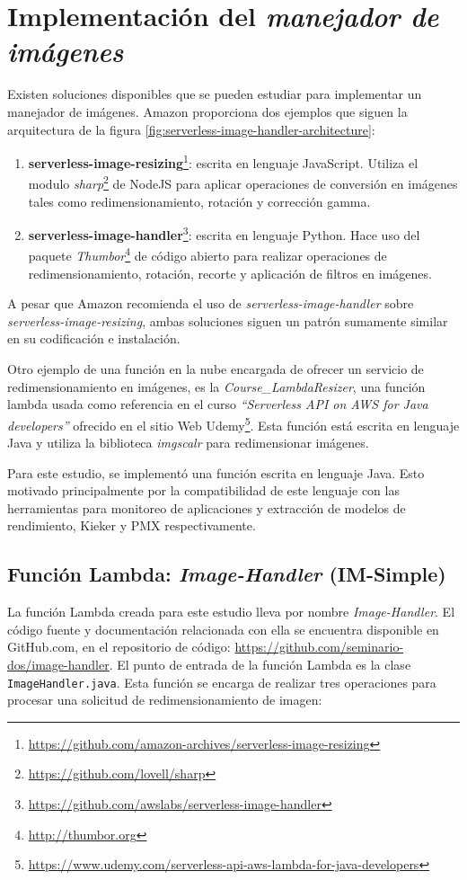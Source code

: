 \section{Implementación del \emph{manejador de imágenes}}
Existen soluciones disponibles que se pueden estudiar para implementar un manejador de imágenes. Amazon proporciona dos ejemplos que siguen la arquitectura de la figura \ref{fig:serverless-image-handler-architecture}:
\begin{enumerate}
    \item \textbf{{serverless-image-resizing}}\footnote{\url{https://github.com/amazon-archives/serverless-image-resizing}}: escrita en lenguaje JavaScript. Utiliza el modulo \emph{sharp}\footnote{\url{https://github.com/lovell/sharp}} de NodeJS para aplicar operaciones de conversión en imágenes tales como redimensionamiento, rotación y corrección gamma.
    \item \textbf{{serverless-image-handler}}\footnote{\url{https://github.com/awslabs/serverless-image-handler}}: escrita en lenguaje Python. Hace uso del paquete \emph{Thumbor}\footnote{\url{http://thumbor.org}} de código abierto para realizar operaciones de redimensionamiento, rotación, recorte y aplicación de filtros en imágenes.
\end{enumerate}

A pesar que Amazon recomienda el uso de \emph{serverless-image-handler} sobre \emph{serverless-image-resizing}, ambas soluciones siguen un patrón sumamente similar en su codificación e instalación. 

Otro ejemplo de una función en la nube encargada de ofrecer un servicio de redimensionamiento en imágenes, es la \emph{Course\_LambdaResizer}, una función lambda usada como referencia en el curso \emph{``Serverless API on AWS for Java developers''} ofrecido en el sitio Web Udemy\footnote{\url{https://www.udemy.com/serverless-api-aws-lambda-for-java-developers}}. Esta función está escrita en lenguaje Java y utiliza la biblioteca \emph{imgscalr} para redimensionar imágenes.

Para este estudio, se implementó una función escrita en lenguaje Java. Esto motivado principalmente por la compatibilidad de este lenguaje con las herramientas para monitoreo de aplicaciones y extracción de modelos de rendimiento, Kieker y PMX respectivamente.

\subsection{Función Lambda: \emph{Image-Handler} (IM-Simple)}\label{sec:image-handler}
La función Lambda creada para este estudio lleva por nombre \emph{Image-Handler}. El código fuente y documentación relacionada con ella se encuentra disponible en GitHub.com, en el repositorio de código: \url{https://github.com/seminario-dos/image-handler}. El punto de entrada de la función Lambda es la clase \texttt{ImageHandler.java}. Esta función se encarga de realizar tres operaciones para procesar una solicitud de redimensionamiento de imagen:

